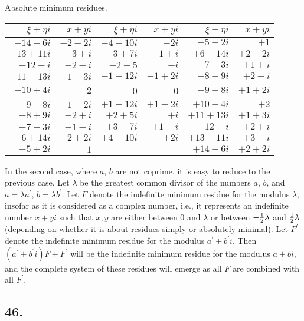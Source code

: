 \documentclass[twoside,12pt, showframe]{memoir}
\let\oldfrac\frac
\def\frac#1#2{\mathchoice{\tfrac{#1}{#2}}{\oldfrac{#1}{#2}}{\genfrac{}{}{}{2}{#1}{#2\mathstrut}}{\genfrac{}{}{}{3}{#1}{#2\mathstrut}}}
\begin{document}
\begin{center}
Absolute minimum residues.\\
\begin{tabular}{r|r||r|r||r|r}
\(\xi+\eta i\) & \(x+yi\) & \(\xi+\eta i\) & \(x+yi\) & \(\xi+\eta i\) & \(x+yi\) \\
\hline
\(-14-6i\) & \(-2-2i\) & \(-4-10i\) & \(-2i\) & \(+5-2i\) & \(+1\) \\
\(-13+11i\) & \(-3+i\) & \(-3+7i\) & \(-1+i\) & \(+6-14i\) & \(+2-2i\) \\
\(-12-i\) & \(-2-i\) & \(-2-5\) & \(-i\) & \(+7+3i\) & \(+1+i\) \\
\(-11-13i\) & \(-1-3i\) & \(-1+12i\) & \(-1+2i\) & \(+8-9i\) & \(+2-i\) \\
\(-10+4i\) & \(-2\) & 0 & 0 & \(+9+8i\) & \(+1+2i\) \\
\(-9-8i\) & \(-1-2i\) & \(+1-12i\) & \(+1-2i\) & \(+10-4i\) & \(+2\) \\
\(-8+9i\) & \(-2+i\) & \(+2+5i\) & \(+i\) & \(+11+13i\) & \(+1+3i\) \\
\(-7-3i\) & \(-1-i\) & \(+3-7i\) & \(+1-i\) & \(+12+i\) & \(+2+i\) \\
\(-6+14i\) & \(-2+2i\) & \(+4+10i\) & \(+2i\) & \(+13-11i\) & \(+3-i\) \\
\(-5+2i\) & \(-1\) &\multicolumn{2}{c||}{} & \(+14+6i\) & \(+2+2i\) \\
\end{tabular}
\end{center}
%

In the second case, where \(a\), \(b\) are not coprime, it is easy to reduce to the previous case. Let \(\lambda\) be the greatest common divisor of the numbers \(a\), \(b\), and \(a=\lambda a^{\prime}\), \(b=\lambda b^{\prime}\). Let \(F\) denote the indefinite minimum residue for the modulus \(\lambda\), insofar as it is considered as a complex number, i.e., it represents an indefinite number \(x+yi\) such that \(x, y\) are either between 0 and \(\lambda\) or between \(-\frac{1}{2}\lambda\) and \(\frac{1}{2}\lambda\) (depending on whether it is about residues simply or absolutely minimal). Let \(F^{\prime}\) denote the indefinite minimum residue for the modulus \(a^{\prime}+b^{\prime}i\). Then \((a^{\prime}+b^{\prime}i)F+F^{\prime}\) will be the indefinite minimum residue for the modulus \(a+bi\), and the complete system of these residues will emerge as all \(F\) are combined with all \(F^{\prime}\).
%

\subsection*{46.}
\end{document}
